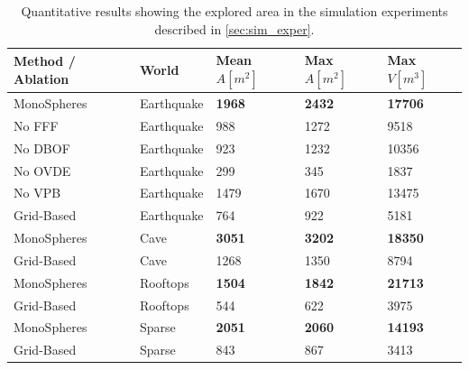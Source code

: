 \documentclass[letterpaper, 10 pt, journal, twoside]{IEEEtran}
\begin{document}
{%
\begin{table}[h!]
  \caption{{Quantitative results showing the explored area in the simulation experiments described in \autoref{sec:sim_exper}.} }
\centering
  \begin{tabular}{m{18mm} m{12mm} m{10mm} m{10mm} m{10mm}} 
 \hline
    \textbf{Method / Ablation} & \textbf{World} & \textbf{Mean} $A \left[m^2 \right] $ & \textbf{Max} $A \left[ m^2 \right] $ & \textbf{Max} $V \left[ m^3 \right] $\\ [0.5ex] 
 \hline\hline
    MonoSpheres  & Earthquake & \textbf{1968}& \textbf{2432}& \textbf{17706} \\
    No FFF  & Earthquake & 988& 1272& 9518 \\
    No DBOF  & Earthquake & 923& 1232& 10356 \\
    No OVDE  & Earthquake & 299& 345& 1837 \\
    No VPB  & Earthquake & 1479& 1670& 13475 \\
    Grid-Based & Earthquake  & 764& 922& 5181 \\
    \hline
    MonoSpheres  & Cave & \textbf{3051}& \textbf{3202} & \textbf{18350} \\
    Grid-Based & Cave  & 1268& 1350& 8794 \\
    \hline
    MonoSpheres  & Rooftops & \textbf{1504}& \textbf{1842}& \textbf{21713} \\
    Grid-Based & Rooftops  & 544& 622& 3975 \\
    \hline
    MonoSpheres  & Sparse & \textbf{2051}& \textbf{2060}& \textbf{14193} \\
    Grid-Based & Sparse  & 843& 867& 3413 \\
 \hline
\end{tabular}
\label{table:sim_exper}
\end{table}

}
\end{document}
